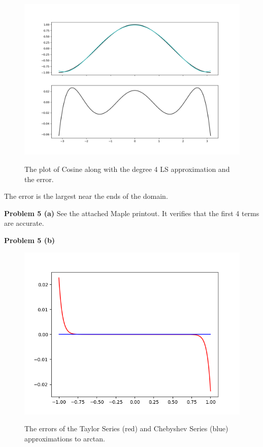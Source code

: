 \documentclass[12pt]{article}
\newcommand{\problem}[1]{\hspace{-4 ex} \large \textbf{Problem #1} }
\begin{document}
	\begin{figure}[h]
		\caption{The plot of Cosine along with the degree 4 LS approximation and the error.}
		\includegraphics[width=1.0\textwidth]{hw6_p4_fig1}
		\label{legendre_approx}
		\centering
	\end{figure}

	The error is the largest near the ends of the domain. 
	
\problem{5 (a)} See the attached Maple printout. It verifies that the first 4 terms are accurate. \\
\cleardoublepage

\problem{5 (b)} 

	\begin{figure}[h]
		\caption{The errors of the Taylor Series (red) and Chebyshev Series (blue) approximations to arctan.}
		\includegraphics[width=1.0\textwidth]{hw6_p5_fig1}
		\label{arctan_approx}
		\centering
	\end{figure}
	
\end{document}
